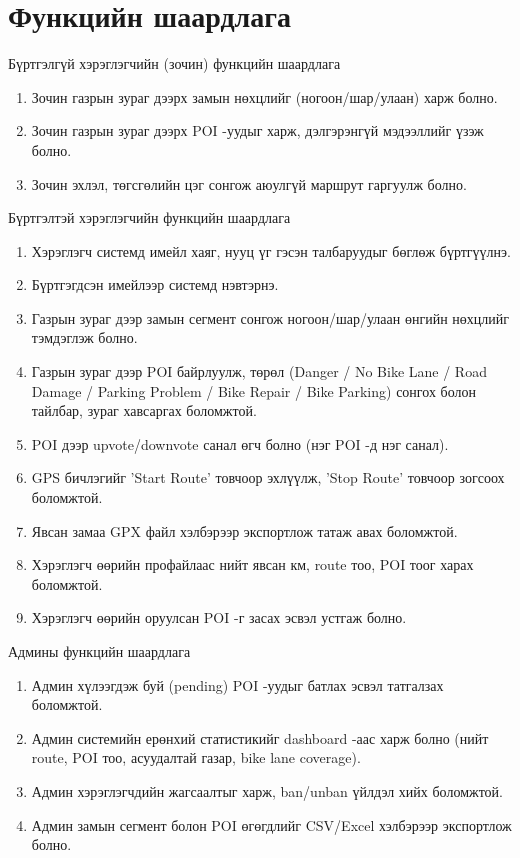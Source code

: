 \section{Функцийн шаардлага}
Бүртгэлгүй хэрэглэгчийн (зочин) функцийн шаардлага
\begin{enumerate}
    \item Зочин газрын зураг дээрх замын нөхцлийг (ногоон/шар/улаан) харж болно.
    \item Зочин газрын зураг дээрх POI -уудыг харж, дэлгэрэнгүй мэдээллийг үзэж болно.
    \item Зочин эхлэл, төгсгөлийн цэг сонгож аюулгүй маршрут гаргуулж болно.
\end{enumerate}
Бүртгэлтэй хэрэглэгчийн функцийн шаардлага
\begin{enumerate}
    \item Хэрэглэгч системд имейл хаяг, нууц үг гэсэн талбаруудыг бөглөж бүртгүүлнэ.
    \item Бүртгэгдсэн имейлээр системд нэвтэрнэ.
    \item Газрын зураг дээр замын сегмент сонгож ногоон/шар/улаан өнгийн нөхцлийг тэмдэглэж болно.
    \item Газрын зураг дээр POI байрлуулж, төрөл (Danger / No Bike Lane / Road Damage / Parking Problem / Bike Repair / Bike Parking) сонгох болон тайлбар, зураг хавсаргах боломжтой.
    \item POI дээр upvote/downvote санал өгч болно (нэг POI -д нэг санал).
    \item GPS бичлэгийг 'Start Route' товчоор эхлүүлж, 'Stop Route' товчоор зогсоох боломжтой.
    \item Явсан замаа GPX файл хэлбэрээр экспортлож татаж авах боломжтой.
    \item Хэрэглэгч өөрийн профайлаас нийт явсан км, route тоо, POI тоог харах боломжтой.
    \item Хэрэглэгч өөрийн оруулсан POI -г засах эсвэл устгаж болно.
\end{enumerate}
Админы функцийн шаардлага
\begin{enumerate}
    \item Админ хүлээгдэж буй (pending) POI -уудыг батлах эсвэл татгалзах боломжтой.
    \item Админ системийн ерөнхий статистикийг dashboard -аас харж болно (нийт route, POI тоо, асуудалтай газар, bike lane coverage).
    \item Админ хэрэглэгчдийн жагсаалтыг харж, ban/unban үйлдэл хийх боломжтой.
    \item Админ замын сегмент болон POI өгөгдлийг CSV/Excel хэлбэрээр экспортлож болно.
\end{enumerate}
